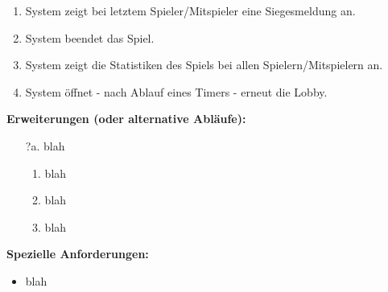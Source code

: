 \documentclass[11pt,ngerman]{article}
\begin{document}
\begin{tcolorbox}
                    \begin{enumerate}[resume]
                        \item System zeigt bei letztem Spieler/Mitspieler eine Siegesmeldung an.
                        \item System beendet das Spiel.
                        \item System zeigt die Statistiken des Spiels bei allen Spielern/Mitspielern an.
                        \item System öffnet - nach Ablauf eines Timers  - erneut die \Gls{Lobby}.
                    \end{enumerate}
                    \textbf{Erweiterungen (oder alternative Abläufe):}
                    \begin{itemize}
                        \item[?a.] blah
                            \begin{enumerate}
                                \item blah
                                \item blah
                                \item blah
                            \end{enumerate}
                    \end{itemize}
                    \textbf{Spezielle Anforderungen:}
                     \begin{itemize}
                        \item blah
                    \end{itemize}

                \end{tcolorbox}

            \newpage
\end{document}
